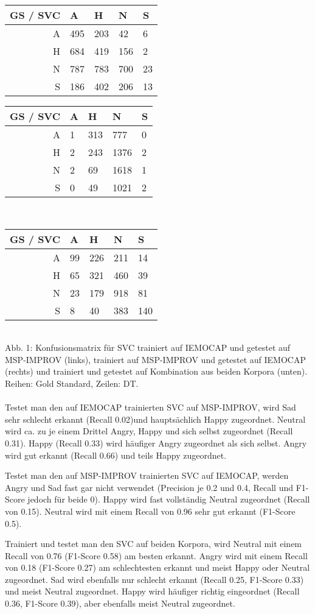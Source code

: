 \begin{tabular}{|r|llll|}
\hline
GS / SVC & A & H & N & S \\
\hline
A & 495 & 203 & 42 & 6 \\
H & 684 & 419 & 156 & 2 \\
N & 787 & 783 & 700 & 23 \\
S & 186 & 402 & 206 & 13 \\
\hline
\end{tabular}
\begin{tabular}{|r|llll|}
\hline
GS / SVC & A & H & N & S \\
\hline
A & 1 & 313 & 777 & 0 \\
H & 2 & 243 & 1376 & 2 \\
N & 2 & 69 & 1618 & 1 \\
S & 0 & 49 & 1021 & 2 \\
\hline
\end{tabular} \\
\begin{tabular}{|r|llll|}
\hline
GS / SVC & A & H & N & S \\
\hline
A & 99 & 226 & 211 & 14 \\
H & 65 & 321 & 460 & 39 \\
N & 23 & 179 & 918 & 81 \\
S & 8 & 40 & 383 & 140 \\
\hline
\end{tabular} \\

Abb. 1: Konfusionsmatrix für SVC trainiert auf IEMOCAP und getestet auf MSP-IMPROV (links), trainiert auf MSP-IMPROV und getestet auf IEMOCAP (rechts) und trainiert und getestet auf Kombination aus beiden Korpora (unten). Reihen: Gold Standard, Zeilen: DT. \\ \\

Testet man den auf IEMOCAP trainierten SVC auf MSP-IMPROV, wird Sad sehr schlecht erkannt (Recall 0.02)und hauptsächlich Happy zugeordnet. Neutral wird ca. zu je einem Drittel Angry, Happy und sich selbst zugeordnet (Recall 0.31). Happy (Recall 0.33) wird häufiger Angry zugeordnet als sich selbst. Angry wird gut erkannt (Recall 0.66) und teils Happy zugeordnet. 

Testet man den auf MSP-IMPROV trainierten SVC auf IEMOCAP, werden Angry und Sad fast gar nicht verwendet (Precision je 0.2 und 0.4, Recall und F1-Score jedoch für beide 0). Happy wird fast vollständig Neutral zugeordnet (Recall von 0.15). Neutral wird mit einem Recall von 0.96 sehr gut erkannt (F1-Score 0.5). 

Trainiert und testet man den SVC auf beiden Korpora, wird Neutral mit einem Recall von 0.76 (F1-Score 0.58) am besten erkannt. Angry wird mit einem Recall von 0.18 (F1-Score 0.27) am schlechtesten erkannt und meist Happy oder Neutral zugeordnet. Sad wird ebenfalls nur schlecht erkannt (Recall 0.25, F1-Score 0.33) und meist Neutral zugeordnet. Happy wird häufiger richtig eingeordnet (Recall 0.36, F1-Score 0.39), aber ebenfalls meist Neutral zugeordnet. 